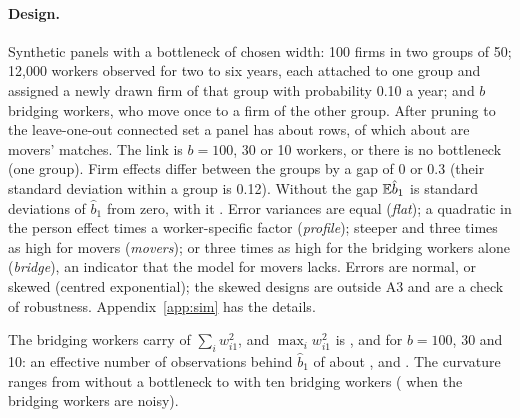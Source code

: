 \paragraph{Design.} Synthetic panels with a bottleneck of chosen width: 100 firms in two groups of 50; 12,000
workers observed for two to six years, each attached to one group and assigned a newly drawn firm of that
group with probability 0.10 a year; and $b$ bridging workers, who move once to a firm of the other group. After pruning to the
leave-one-out connected set a panel has about  rows, of which about  are
movers' matches. The link is $b=100$, 30 or 10 workers, or there is no bottleneck (one group). Firm effects
differ between the groups by a gap of 0 or 0.3 (their standard deviation within a group is 0.12). Without the
gap $\mathbb{E}\hat b_1$ is  standard deviations of $\hat b_1$ from zero, with it . Error
variances are equal (\emph{flat}); a quadratic
in the person effect times a worker-specific factor (\emph{profile}); steeper and three times as high for movers
(\emph{movers}); or three times as high for the bridging workers alone (\emph{bridge}), an indicator that the
model for movers lacks. Errors are normal, or skewed (centred exponential); the skewed designs are outside A3
and are a check of robustness. Appendix~\ref{app:sim} has the details.

The bridging workers carry  of $\sum_iw_{i1}^2$, and $\max_iw_{i1}^2$ is
,  and  for $b=100$, 30 and 10: an effective number of
observations behind $\hat b_1$ of about ,  and . The curvature ranges
from  without a bottleneck to  with ten bridging workers
( when the bridging workers are noisy).

